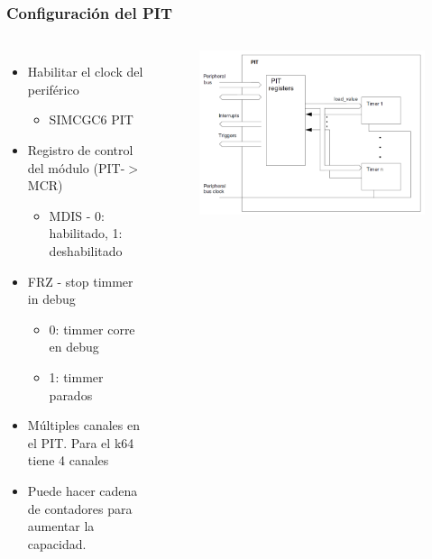 \documentclass[10.5pt,scale=1.0,t,aspectratio=169,hyperref={pdfpagelabels=false}]{beamer}
\begin{document}
\begin{frame}
	\frametitle{Configuración del PIT }
	{\small
		\begin{columns}
			\begin{itemize}
				\item Habilitar el clock del periférico
				\begin{itemize}
					\item SIMCGC6 PIT
				\end{itemize}
				\item Registro de control del módulo (PIT-$>$MCR)
				\begin{itemize}
					\item MDIS - 0: habilitado, 1: deshabilitado
				\end{itemize}
				\item FRZ - stop timmer in debug
				\begin{itemize}
					\item 0: timmer corre en debug
					\item 1: timmer parados
				\end{itemize}
				\item Múltiples canales en el PIT. Para el k64 tiene 4 canales
				\item Puede hacer cadena de contadores para aumentar la capacidad. 
			\end{itemize}
			
			\begin{figure}
				\centering
				\includegraphics[scale=0.5]{04_PITHardware}
			\end{figure}
		\end{columns}
	}
\end{frame}
\end{document}
